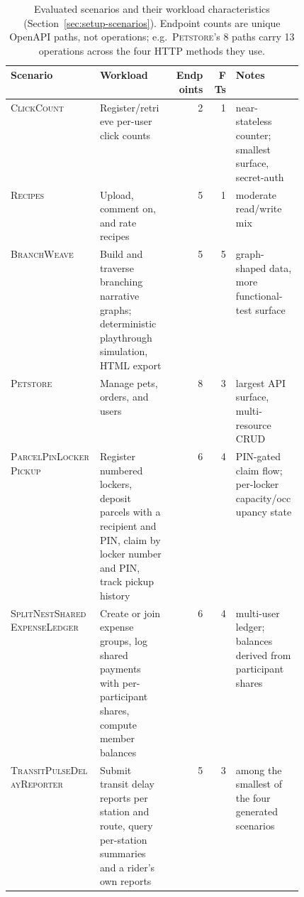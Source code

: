 \begin{table}[htbp]
  \centering
  \caption{Evaluated scenarios and their workload characteristics
    (Section~\ref{sec:setup-scenarios}). Endpoint counts are unique
    OpenAPI paths, not operations; e.g.\ \textsc{Petstore}'s 8 paths carry
    13 operations across the four HTTP methods they use.}
  \label{tab:appendix-scenarios}
  \small
  \begin{tabular}{@{}lp{0.25\linewidth}rrp{0.23\linewidth}@{}}
    \toprule
    \textbf{Scenario} & \textbf{Workload} & \textbf{Endpoints} & \textbf{FTs} & \textbf{Notes} \\
    \midrule
    \textsc{ClickCount} &
      Register/retrieve per-user click counts &
      2 & 1 &
      near-stateless counter; smallest surface, secret-auth \\
    \textsc{Recipes} &
      Upload, comment on, and rate recipes &
      5 & 1 &
      moderate read/write mix \\
    \textsc{BranchWeave} &
      Build and traverse branching narrative graphs; deterministic
      playthrough simulation, HTML export &
      5 & 5 &
      graph-shaped data, more functional-test surface \\
    \textsc{Petstore} &
      Manage pets, orders, and users &
      8 & 3 &
      largest API surface, multi-resource CRUD \\
    \textsc{ParcelPinLockerPickup} &
      Register numbered lockers, deposit parcels with a recipient and
      PIN, claim by locker number and PIN, track pickup history &
      6 & 4 &
      PIN-gated claim flow; per-locker capacity/occupancy state \\
    \textsc{SplitNestSharedExpenseLedger} &
      Create or join expense groups, log shared payments with
      per-participant shares, compute member balances &
      6 & 4 &
      multi-user ledger; balances derived from participant shares \\
    \textsc{TransitPulseDelayReporter} &
      Submit transit delay reports per station and route, query
      per-station summaries and a rider's own reports &
      5 & 3 &
      among the smallest of the four generated scenarios \\
    \bottomrule
  \end{tabular}
\end{table}
